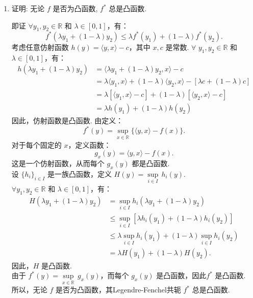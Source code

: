 \begin{enumerate}
    \item[2.]证明: 无论 \(f\) 是否为凸函数, \(f^{*}\) 总是凸函数.
    \begin{solution}
        即证 $\forall y_1, y_2 \in \mathbb{R}$ 和 \( \lambda \in [0,1] \)，有：
        \[
        f^*(\lambda y_1 + (1-\lambda) y_2) \leq \lambda f^*(y_1) + (1-\lambda) f^*(y_2).
        \]
        考虑任意仿射函数 \(\displaystyle  h(y) = \langle y, x \rangle - c \)，其中 \( x, c \) 是常数.
        $\forall$ \( y_1, y_2 \in \mathbb{R} \) 和 \( \lambda \in [0,1] \)，有：
        \[
        \begin{aligned}
            h(\lambda y_1 + (1-\lambda) y_2) &= \langle \lambda y_1 + (1-\lambda) y_2, x \rangle - c \\
            &= \lambda \langle y_1, x \rangle + (1-\lambda) \langle y_2, x \rangle - [\lambda c + (1-\lambda) c] \\
            &= \lambda [\langle y_1, x \rangle - c] + (1-\lambda) [\langle y_2, x \rangle - c] \\
            &= \lambda h(y_1) + (1-\lambda) h(y_2)
        \end{aligned}
        \]
        因此，仿射函数是凸函数.
        由定义：
        \[
        f^*(y) = \sup_{x \in \mathbb{R}} \{ \langle y, x \rangle - f(x) \}.
        \]
        对于每个固定的 \( x \)，定义函数：
        \[
        g_x(y) = \langle y, x \rangle - f(x).
        \]
        这是一个仿射函数，从而每个 \( g_x(y) \) 都是凸函数.\\
        设 \( \{ h_i \}_{i \in I} \) 是一族凸函数，定义 \( \displaystyle H(y) = \underset{{i \in I}}{\sup} \,h_i(y) \).\\
        $\forall$\( y_1, y_2 \in \mathbb{R} \) 和 \( \lambda \in [0,1] \)，有：
        \[
        \begin{aligned}
            H(\lambda y_1 + (1-\lambda) y_2) &= \sup_{i \in I} h_i(\lambda y_1 + (1-\lambda) y_2) \\
            &\leq \sup_{i \in I} [\lambda h_i(y_1) + (1-\lambda) h_i(y_2)] \\
            &\leq \lambda \sup_{i \in I} h_i(y_1) + (1-\lambda) \sup_{i \in I} h_i(y_2) \\
            &= \lambda H(y_1) + (1-\lambda) H(y_2).
        \end{aligned}
        \]
        因此，\( H \) 是凸函数.\\
        由于 \(\displaystyle  f^*(y) = \underset{{x \in \mathbb{R}}}{\sup}\, g_x(y) \)，而每个 \( g_x(y) \) 是凸函数，因此\( f^* \) 是凸函数.\\
        所以，无论 \( f \) 是否为凸函数，其Legendre-Fenchel共轭 \( f^* \) 总是凸函数.
    \end{solution}


\end{enumerate}
